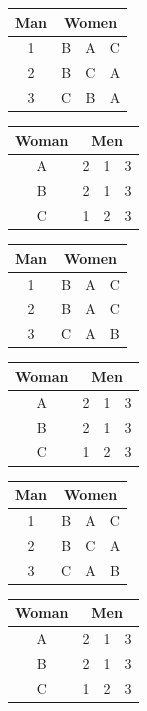 \documentclass[11pt]{article}
\begin{document}
\begin{qunlist}
\begin{itemize}
\begin{center}
\begin{tabular}{|c|ccc|}\hline 
Man&\multicolumn{3}{|c|}{Women}\\\hline 
1&B&A&C\\\hline 
2&B&C&A\\\hline 
3&C&B&A\\\hline
\end{tabular} 
\hspace{2cm}
\begin{tabular}{|c|ccc|}\hline 
Woman&\multicolumn{3}{|c|}{Men}\\\hline 
A&2&1&3\\\hline 
B&2&1&3\\\hline 
C&1&2&3\\\hline
\end{tabular}
\end{center}

\begin{center}
\begin{tabular}{|c|ccc|}\hline 
Man&\multicolumn{3}{|c|}{Women}\\\hline 
1&B&A&C\\\hline 
2&B&A&C\\\hline 
3&C&A&B\\\hline
\end{tabular} 
\hspace{2cm}
\begin{tabular}{|c|ccc|}\hline 
Woman&\multicolumn{3}{|c|}{Men}\\\hline 
A&2&1&3\\\hline 
B&2&1&3\\\hline 
C&1&2&3\\\hline
\end{tabular}
\end{center}

\begin{center}
\begin{tabular}{|c|ccc|}\hline 
Man&\multicolumn{3}{|c|}{Women}\\\hline 
1&B&A&C\\\hline 
2&B&C&A\\\hline 
3&C&A&B\\\hline
\end{tabular} 
\hspace{2cm}
\begin{tabular}{|c|ccc|}\hline 
Woman&\multicolumn{3}{|c|}{Men}\\\hline 
A&2&1&3\\\hline 
B&2&1&3\\\hline 
C&1&2&3\\\hline
\end{tabular}
\end{center}


\end{itemize}
\end{qunlist}
\end{document}
